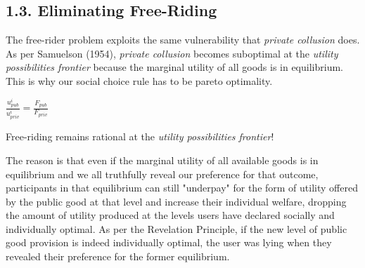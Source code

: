 \documentclass[oneside]{article}   	%
\begin{document}
\subsection*{1.3. Eliminating Free-Riding}
\vspace{0.5em}

The free-rider problem exploits the same vulnerability that \textit{private collusion} does. As per Samuelson (1954), \textit{private collusion} becomes suboptimal at the \textit{utility possibilities frontier} because the marginal utility of all goods is in equilibrium. This is why our social choice rule has to be pareto optimality.

\LARGE
\begin{adjustwidth}{1.5em}{1.5em}
\begin{math}
\frac{u_{pub}^i}{u_{priv}^i} = \frac{F_{pub}}{F_{priv}}
\end{math}
\end{adjustwidth}
\normalsize

Free-riding remains rational at the \textit{utility possibilities frontier}!

The reason is that even if the marginal utility of all available goods is in equilibrium and we all truthfully reveal our preference for that outcome, participants in that equilibrium can still "underpay" for the form of utility offered by the public good at that level and increase their individual welfare, dropping the amount of utility produced at the levels users have declared socially and individually optimal. As per the Revelation Principle, if the new level of public good provision is indeed individually optimal, the user was lying when they revealed their preference for the former equilibrium.


\pagebreak
\end{document}
